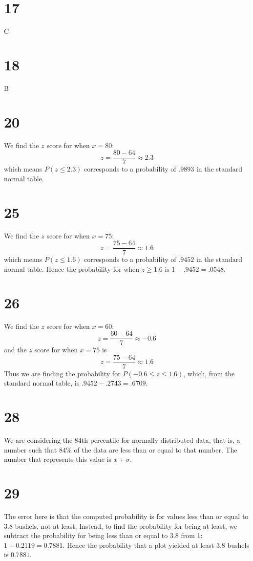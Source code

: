 \documentclass{article}
\theoremstyle{definition}
\newcommand{\?}{\stackrel{?}{=}}
\begin{document}
\section*{17}
C

\section*{18}
B

\section*{20}
We find the $z$ score for when $x=80$: \[ z=\frac{80-64}{7}\approx 2.3 \] which means $P(z\le 2.3)$ corresponds to a probability of $.9893$ in the standard normal table.

\section*{25}
We find the $z$ score for when $x=75$: \[ z=\frac{75-64}{7}\approx 1.6 \] which means $P(z\le 1.6)$ corresponds to a probability of $.9452$ in the standard normal table. Hence the 
probability for when $z\ge 1.6$ is $1-.9452=.0548$.

\section*{26}
We find the $z$ score for when $x=60$: \[ z=\frac{60-64}{7}\approx -0.6 \] and the $z$ score for when $x=75$ is \[ z=\frac{75-64}{7}\approx 1.6 \] Thus we are finding the probability for
$P(-0.6\le z\le 1.6)$, which, from the standard normal table, is $.9452-.2743=.6709$.

\section*{28}
We are considering the 84th percentile for normally distributed data, that is, a number such that $84\%$ of the data are less than or equal to that number. The number that represents this value is 
$\bar{x}+\sigma$.

\section*{29}
The error here is that the computed probability is for values less than or equal to $3.8$ bushels, not at least. Instead, to find the probability for being at least, we subtract the probability for being less than or 
equal to $3.8$ from 1: $1-0.2119=0.7881$. Hence the probability that a plot yielded at least 3.8 bushels is $0.7881$.
\end{document}
